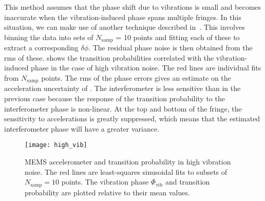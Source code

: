 \par\noindent
This method assumes that the phase shift due to vibrations is small
and becomes inaccurate when the vibration-induced phase spans multiple
fringes. In this situation, we can make use of another technique
described in~\cite{Merlet2009}. This involves binning the data into
sets of $N_\text{samp}$ = 10 points and fitting each of these to
extract a corresponding $\delta \phi$. The residual phase noise is
then obtained from the rms of these.  shows
the transition probabilities correlated with the vibration-induced
phase in the case of high vibration noise. The red lines are
individual fits from $N_\text{samp}$ points. The rms of the phase
errors gives an
estimate on the acceleration uncertainty of
. The interferometer is less
sensitive than in the previous case because the response of the
transition probability to the interferometer phase is non-linear.
At the top and bottom of the fringe, the sensitivity to accelerations is greatly
suppressed, which means that the estimated interferometer phase will have a
greater variance.
\begin{figure}[htpb!]
  \centering
  \texttt{[image: high\_vib]}
  \caption[MEMS accelerometer and transition probability in high
  vibration noise]{MEMS accelerometer and transition probability in high
  vibration noise. The red lines are least-squares sinusoidal fits to
subsets of $N_\text{samp} = 10$ points. The vibration phase
$\Phi_\text{vib}$ and transition probability are plotted relative to
their mean values.}
\label{fig:high_vib}
\end{figure}

